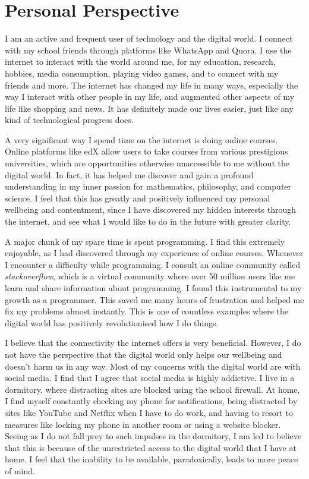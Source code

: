 \documentclass[a4paper, 11pt]{article}
\begin{document}
\section*{Personal Perspective}

  I am an active and frequent user of technology and the digital world. I connect with my school friends through platforms like WhatsApp and Quora. I use the internet to interact with the world around me, for my education, research, hobbies, media consumption, playing video games, and to connect with my friends and more. The internet has changed my life in many ways, especially the way I interact with other people in my life, and augmented other aspects of my life like shopping and news. It has definitely made our lives easier, just like any kind of technological progress does.

  A very significant way I spend time on the internet is doing online courses. Online platforms like edX allow users to take courses from various prestigious universities, which are opportunities otherwise unaccessible to me without the digital world. In fact, it has helped me discover and gain a profound understanding in my inner passion for mathematics, philosophy, and computer science. I feel that this has greatly and positively influenced my personal wellbeing and contentment, since I have discovered my hidden interests through the internet, and see what I would like to do in the future with greater clarity.

  A major chunk of my spare time is spent programming. I find this extremely enjoyable, as I had discovered through my experience of online courses. Whenever I encounter a difficulty while programming, I consult an online community called \emph{stackoverflow}, which is a virtual community where over 50 million users like me learn and share information about programming. I found this instrumental to my growth as a programmer. This saved me many hours of frustration and helped me fix my problems almost instantly. This is one of countless examples where the digital world has positively revolutionised how I do things.

  I believe that the connectivity the internet offers is very beneficial. However, I do not have the perspective that the digital world only helps our wellbeing and doesn't harm us in any way. Most of my concerns with the digital world are with social media. I find that I agree that social media is highly addictive. I live in a dormitory, where distracting sites are blocked using the school firewall. At home, I find myself constantly checking my phone for notifications, being distracted by sites like YouTube and Netflix when I have to do work, and having to resort to measures like locking my phone in another room or using a website blocker. Seeing as I do not fall prey to such impulses in the dormitory, I am led to believe that this is because of the unrestricted access to the digital world that I have at home. I feel that the inability to be available, paradoxically, leads to more peace of mind.
\end{document}
